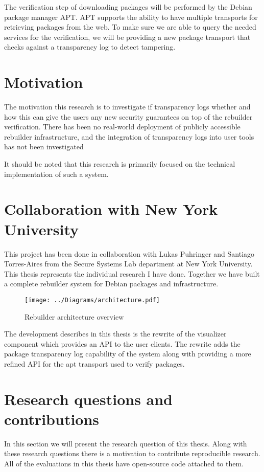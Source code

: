 \documentclass[../Main/thesis.tex]{subfiles}
\begin{document}
The verification step of downloading packages will be performed by the Debian
package manager APT. APT supports the ability to have multiple transports for
retrieving packages from the web. To make sure we are able to query the needed
services for the verification, we will be providing a new package transport that
checks against a transparency log to detect tampering.

\section{Motivation}\label{sec:motivation}
The motivation this research is to investigate if transparency logs whether and
how this can give the users any new security guarantees on top of the rebuilder
verification. There has been no real-world deployment of publicly accessible
rebuilder infrastructure, and the integration of transparency logs into user
tools has not been investigated 

It should be noted that this research is primarily focused on the technical
implementation of such a system.

\section{Collaboration with New York University}\label{sec:collab}
This project has been done in collaboration with Lukas Puhringer and Santiago
Torres-Aires from the Secure Systems Lab department at New York University. This
thesis represents the individual research I have done. Together we have built a
complete rebuilder system for Debian packages and infrastructure. 

\begin{figure}[H]
\centering
\texttt{[image: ../Diagrams/architecture.pdf]}
\caption{Rebuilder architecture overview}
\label{fig:rebuilder_architecture}
\end{figure}

The development describes in this thesis is the rewrite of the visualizer
component which provides an API to the user clients. The rewrite adds the
package transparency log capability of the system along with providing a more
refined API for the apt transport used to verify packages.

\section{Research questions and contributions}\label{sec:rq}
In this section we will present the research question of this thesis.  Along
with these research questions there is a motivation to contribute reproducible
research. All of the evaluations in this thesis have open-source code attached
to them.
\end{document}
